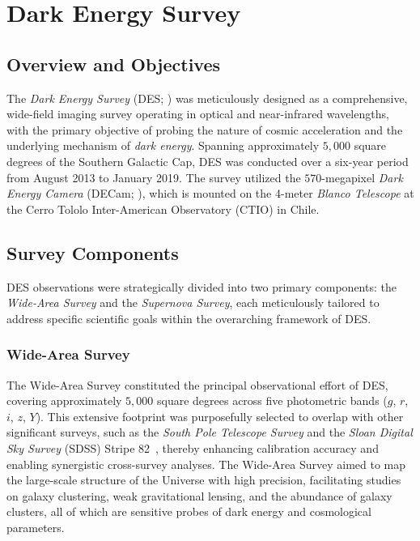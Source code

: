 \section{Dark Energy Survey}

\subsection{Overview and Objectives}

The \emph{Dark Energy Survey} (DES; \citealt{2005astro.ph.10346T, 2018ApJS..239...18A, 2021ApJS..255...20A}) was meticulously designed as a comprehensive, wide-field imaging survey operating in optical and near-infrared wavelengths, with the primary objective of probing the nature of cosmic acceleration and the underlying mechanism of \emph{dark energy}. Spanning approximately $5{,}000$ square degrees of the Southern Galactic Cap, DES was conducted over a six-year period from August 2013 to January 2019. The survey utilized the $570$-megapixel \emph{Dark Energy Camera} (DECam; \citealt{2015AJ....150..150F}), which is mounted on the 4-meter \emph{Blanco Telescope} at the Cerro Tololo Inter-American Observatory (CTIO) in Chile.

\subsection{Survey Components}

DES observations were strategically divided into two primary components: the \emph{Wide-Area Survey} and the \emph{Supernova Survey}, each meticulously tailored to address specific scientific goals within the overarching framework of DES.

\subsubsection{Wide-Area Survey}

The Wide-Area Survey constituted the principal observational effort of DES, covering approximately $5{,}000$ square degrees across five photometric bands ($g$, $r$, $i$, $z$, $Y$). This extensive footprint was purposefully selected to overlap with other significant surveys, such as the \emph{South Pole Telescope Survey} and the \emph{Sloan Digital Sky Survey} (SDSS) Stripe 82~\cite{2009ApJS..182..543A}, thereby enhancing calibration accuracy and enabling synergistic cross-survey analyses. The Wide-Area Survey aimed to map the large-scale structure of the Universe with high precision, facilitating studies on galaxy clustering, weak gravitational lensing, and the abundance of galaxy clusters, all of which are sensitive probes of dark energy and cosmological parameters.

